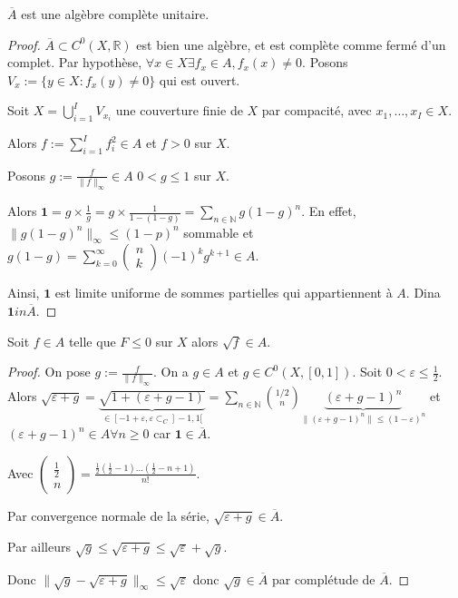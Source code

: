 \begin{lemme}
$\overline{A}$ est une algèbre complète unitaire.
\end{lemme}
\begin{proof}
	$\overline{A} \subset C^0\left(X,\mathbb{R}\right)$ est bien une algèbre, et est complète comme fermé d'un complet. 
	Par hypothèse, $\forall x\in X \exists f_x \in A, f_x\left( x \right) \neq 0 $.
	Posons $V_x := \{y \in X : f_x\left( y \right) \neq 0\} $ qui est ouvert.

	Soit $X = \bigcup_{i=1} ^I V_{x_i}$ une couverture finie de $X$ par compacité, avec $x_1,\ldots,x_I \in X$.

	Alors $f:= \sum_{i=1}^{I} f_i^2 \in A$ et $f>0$ sur $X$.

	Posons $g:= \frac{f}{\|f\|_\infty} \in A$ $0 < g\le 1$ sur $X$.

	Alors $ \mathbf{1} = g \times \frac{1}{g} = g \times \frac{1}{1-(1-g)}  = \sum_{n\in \mathbb{N}}g(1-g)^n$.
En effet, $\|g\left( 1-g \right) ^n\|_{\infty}\le (1-p)^n$ sommable et $g\left( 1-g \right) = \sum_{k=0}^{\infty} \begin{pmatrix} n \\ k \end{pmatrix} (-1)^k g^{k+1} \in A$.

Ainsi, $\mathbf{1} $ est limite uniforme de sommes partielles qui appartiennent à $A$. Dina $\mathbf{1} in \overline{A}$.

\end{proof}

\begin{lemme}
	Soit $ f \in A$ telle que $F\le 0$ sur $X$ alors $\sqrt{f} \in A$.
\end{lemme}
\begin{proof}
	On pose $g := \frac{f}{\|f\|_\infty}$. On a $g \in A$ et $g \in C^0\left(X,[0,1]\right)  $.
	Soit $0< \varepsilon\le \frac{1}{2}$. Alors $\sqrt{\varepsilon+g} = \underbrace{\sqrt{1 + \left( \varepsilon + g -1 \right) } }_{\in [-1 + \varepsilon, \varepsilon \subset_C  ]-1,1[ }=\sum_{n\in \mathbb{N}} \binom{1/2}{n} \underbrace{ \left( \varepsilon + g -1 \right) ^n}_{\|(\varepsilon+g-1)^n\|\le (1-\varepsilon)^n}$ et $\left( \varepsilon+g-1 \right)^n \in A \forall n\ge 0 $ car $\mathbf{1} \in \overline{A}$.

Avec $\begin{pmatrix} \frac{1}{2}\\ n \end{pmatrix} = \frac{\frac{1}{2} (\frac{1}{2} -1) \ldots (\frac{1}{2} - n+1)}{n!}$.

Par convergence normale de la série, $\sqrt{\varepsilon+g} \in \overline{A}$.

Par ailleurs $\sqrt{g} \le \sqrt{\varepsilon+g}  \le \sqrt{\varepsilon} + \sqrt{g} $.

Donc $\|\sqrt{g} - \sqrt{\varepsilon+g} \|_\infty \le \sqrt{\varepsilon} $ donc $\sqrt{g} \in \overline{A}$ par complétude de $\overline{A}$.
\end{proof}

